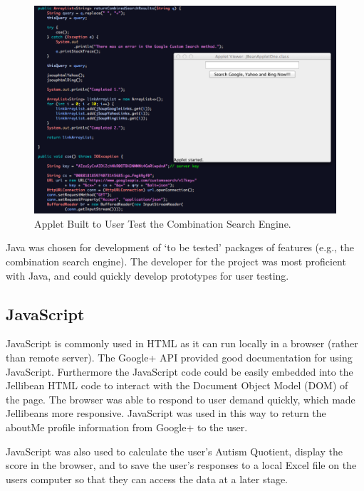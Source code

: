 \documentclass[a4paper, 11pt]{article}
\begin{document}
\begin{figure}[H]
\begin{center}
\includegraphics[scale=0.40]{Applet}
\caption{Applet Built to User Test the Combination Search Engine. }
\label{applet}
\end{center}
\end{figure}

Java was chosen for development of `to be tested' packages of features (e.g., the combination search engine). The developer for the project was most proficient with Java, and could quickly develop prototypes for user testing.

\subsection{JavaScript}

JavaScript is commonly used in HTML as it can run locally in a browser (rather than remote server). The Google+ API provided good documentation for using JavaScript. Furthermore the JavaScript code could be easily embedded into the Jellibean HTML code to interact with the Document Object Model (DOM) of the page. The browser was able to respond to user demand quickly, which made Jellibeans more responsive.
\vspace{5mm}
JavaScript was used in this way to return the aboutMe profile information from Google+ to the user.

\vspace{5mm}
JavaScript was also used to calculate the user's Autism Quotient, display the score in the browser, and to save the user's responses to a local Excel file on the users computer so that they can access the data at a later stage.
\end{document}
